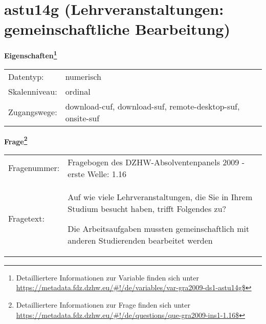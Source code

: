 
    \setcounter{footnote}{0}

    \vspace*{-1.8cm}
	\section{astu14g (Lehrveranstaltungen: gemeinschaftliche Bearbeitung)}
	\label{section:astu14g}



    \vspace*{0.5cm}
    \noindent\textbf{Eigenschaften\footnote{Detailliertere Informationen zur Variable finden sich unter
		\url{https://metadata.fdz.dzhw.eu/\#!/de/variables/var-gra2009-ds1-astu14g$}}}\\
	\begin{tabularx}{\hsize}{@{}lX}
	Datentyp: & numerisch \\
	Skalenniveau: & ordinal \\
	Zugangswege: &
	  download-cuf, 
	  download-suf, 
	  remote-desktop-suf, 
	  onsite-suf
 \\
    \end{tabularx}



				\vspace*{0.5cm}
                \noindent\textbf{Frage\footnote{Detailliertere Informationen zur Frage finden sich unter
		              \url{https://metadata.fdz.dzhw.eu/\#!/de/questions/que-gra2009-ins1-1.16$}}}\\
				\begin{tabularx}{\hsize}{@{}lX}
					Fragenummer: &
					  Fragebogen des DZHW-Absolventenpanels 2009 - erste Welle:
					  1.16
 \\
					Fragetext: & Auf wie viele Lehrveranstaltungen, die Sie in Ihrem Studium besucht haben, trifft Folgendes zu?\par  Die Arbeitsaufgaben mussten gemeinschaftlich mit anderen Studierenden bearbeitet werden \\
				\end{tabularx}





